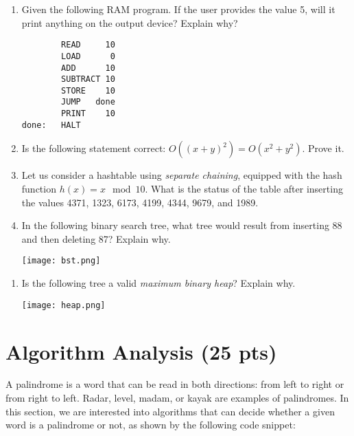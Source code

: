 \documentclass[11pt]{article}
\begin{document}
\begin{enumerate}
\item Given the following RAM program. If the user provides the value 5,
will it print anything on the output device? Explain why?

\begin{verbatim}
        READ     10
        LOAD      0
        ADD      10
        SUBTRACT 10
        STORE    10
        JUMP   done
        PRINT    10
done:   HALT   
\end{verbatim}

\item Is the following statement correct: \(O((x+y)^2) =
    O(x^2+y^2)\). Prove it.

\item Let us consider a hashtable using \emph{separate chaining}, equipped with the hash
function \(h(x) = x \mod 10\). What is the status of the table
after inserting the values 4371, 1323, 6173, 4199, 4344, 9679,
and 1989.

\item In the following binary search tree, what tree would result from
inserting 88 and then deleting 87? Explain why.

\begin{center}
\texttt{[image: bst.png]}
\end{center}
\end{enumerate}



\begin{enumerate}
\item Is the following tree a valid \emph{maximum binary heap}? Explain why.

\begin{center}
\texttt{[image: heap.png]}
\end{center}
\end{enumerate}


\section{Algorithm Analysis (25 pts)}
\label{sec:orge88be4d}

A palindrome is a word that can be read in both directions: from
left to right or from right to left. Radar, level, madam, or kayak
are examples of palindromes. In this section, we are interested into
algorithms that can decide whether a given word is a palindrome or
not, as shown by the following code snippet:
\end{document}
